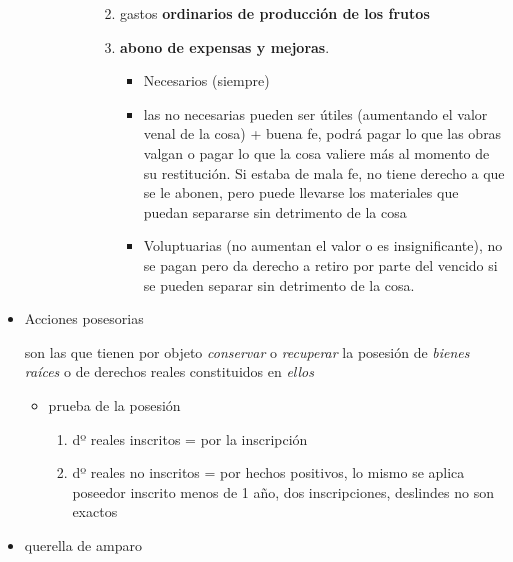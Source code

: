 \documentclass[]{article}
\providecommand{\tightlist}{%
  \setlength{\itemsep}{0pt}\setlength{\parskip}{0pt}}
\begin{document}
\begin{itemize}
\begin{itemize}
\begin{itemize}
\begin{itemize}
        \begin{enumerate}
        \def\labelenumi{\arabic{enumi}.}
        \tightlist
        \item
          gastos \textbf{ordinarios de producción de los frutos}
        \item
          \textbf{abono de expensas y mejoras}.

          \begin{itemize}
          \tightlist
          \item
            Necesarios (siempre)
          \item
            las no necesarias pueden ser útiles (aumentando el valor
            venal de la cosa) + buena fe, podrá pagar lo que las obras
            valgan o pagar lo que la cosa valiere más al momento de su
            restitución. Si estaba de mala fe, no tiene derecho a que se
            le abonen, pero puede llevarse los materiales que puedan
            separarse sin detrimento de la cosa
          \item
            Voluptuarias (no aumentan el valor o es insignificante), no
            se pagan pero da derecho a retiro por parte del vencido si
            se pueden separar sin detrimento de la cosa.
          \end{itemize}
        \end{enumerate}
      \end{itemize}
    \end{itemize}
  \end{itemize}
\item
  Acciones posesorias

  son las que tienen por objeto \emph{conservar} o \emph{recuperar} la
  posesión de \emph{bienes raíces} o de derechos reales constituidos en
  \emph{ellos}

  \begin{itemize}
  \tightlist
  \item
    prueba de la posesión

    \begin{enumerate}
    \def\labelenumi{\arabic{enumi}.}
    \tightlist
    \item
      dº reales inscritos = por la inscripción
    \item
      dº reales no inscritos = por hechos positivos, lo mismo se aplica
      poseedor inscrito menos de 1 año, dos inscripciones, deslindes no
      son exactos
    \end{enumerate}
  \end{itemize}
\item
  querella de amparo


\end{itemize}
\end{document}
